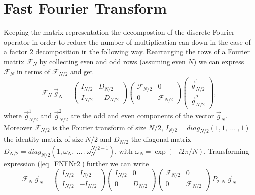 \section{Fast Fourier Transform} \label{sec_fft}
%
Keeping the matrix representation the decompostion of the
discrete Fourier operator in order to reduce the number 
of multiplication can down in the case of a factor $2$
decomposition in the following way.
Rearranging the rows of a Fourier matrix $\mathcal{F}_{N}$
by collecting even and odd rows (assuming even $N$) we
can express $\mathcal{F}_N$ in terms of $\mathcal{F}_{N/2}$
and get
\begin{equation}  \label{eq_FNFNr2}
 \mathcal{F}_{N} \ \vec{g}_{N} 
  =
 \left(
  \begin{array}{cr}
   I_{N/2} &  D_{N/2}
           \\
   I_{N/2} & -D_{N/2}
  \end{array}
 \right)
 \left(
  \begin{array}{cr}
   \mathcal{F}_{N/2} &     0
           \\
        0            & \mathcal{F}_{N/2}
  \end{array}
 \right)
 \left(     
  \begin{array}{c}
   \vec{g}_{N/2}^{1}
    \\
   \vec{g}_{N/2}^{2}
  \end{array} 
 \right),
\end{equation} 
where $\vec{g}^{1}_{N/2}$ and $\vec{g}^{2}_{N/2}$ are the odd and even 
components of the vector $\vec{g}_{N}$. Moreover 
$\mathcal{F}_{N/2}$ is the Fourier transform of size $N/2$, 
$I_{N/2}=diag_{N/2}(1,1, \ \dots \ ,1)$ the identity
matrix of size $N/2$ and $D_{N/2}$ the diagonal matrix 
$D_{N/2} =  diag_{N/2}(1,\omega_{N},\ \dots \ , \omega_{N}^{N/2 - 1})$,
with $\omega_{N} = \exp ( -i 2 \pi / N )$. Transforming expression 
(\ref{eq_FNFNr2}) further we can write
\begin{equation}  \label{eq_FNFNr2_01}
 \mathcal{F}_{N} \ \vec{g}_{N}
  =
 \left(
  \begin{array}{cr}
   I_{N/2} &  I_{N/2}
           \\
   I_{N/2} & -I_{N/2}
  \end{array}
 \right)
 \left(
  \begin{array}{cr}
   I_{N/2} &     0
          \\
      0    &   D_{N/2}
  \end{array}
 \right)
 \left(
  \begin{array}{cr}
   \mathcal{F}_{N/2} &     0
           \\
        0            & \mathcal{F}_{N/2}
  \end{array}
 \right)
  \ P_{2,N} \ \vec{g}_{N}
\end{equation} 

